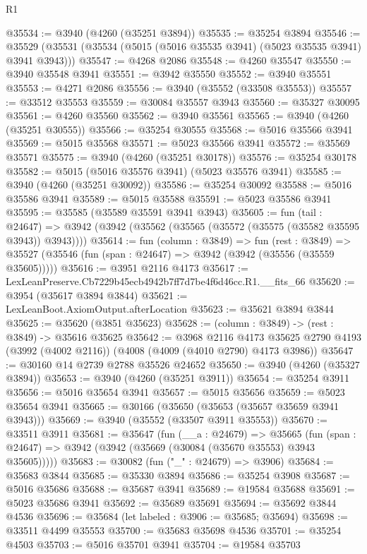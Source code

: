 \begin{lexlean}{R1}
\begin{coremodule}
@35534 := @3940 (@4260 (@35251 @3894))
@35535 := @35254 @3894
@35546 := @35529 (@35531 (@35534 (@5015 (@5016 @35535 @3941) (@5023 @35535 @3941) @3941 @3943)))
@35547 := @4268 @2086
@35548 := @4260 @35547
@35550 := @3940 @35548 @3941
@35551 := @3942 @35550
@35552 := @3940 @35551
@35553 := @4271 @2086
@35556 := @3940 (@35552 (@33508 @35553))
@35557 := @33512 @35553
@35559 := @30084 @35557 @3943
@35560 := @35327 @30095
@35561 := @4260 @35560
@35562 := @3940 @35561
@35565 := @3940 (@4260 (@35251 @30555))
@35566 := @35254 @30555
@35568 := @5016 @35566 @3941
@35569 := @5015 @35568
@35571 := @5023 @35566 @3941
@35572 := @35569 @35571
@35575 := @3940 (@4260 (@35251 @30178))
@35576 := @35254 @30178
@35582 := @5015 (@5016 @35576 @3941) (@5023 @35576 @3941)
@35585 := @3940 (@4260 (@35251 @30092))
@35586 := @35254 @30092
@35588 := @5016 @35586 @3941
@35589 := @5015 @35588
@35591 := @5023 @35586 @3941
@35595 := @35585 (@35589 @35591 @3941 @3943)
@35605 := fun (tail : @24647) =>
  @3942 (@3942 (@35562 (@35565 (@35572 (@35575 (@35582 @35595 @3943)) @3943))))
@35614 := fun (column : @3849) =>
  fun (rest : @3849) =>
  @35527 (@35546 (fun (span : @24647) => @3942 (@3942 (@35556 (@35559 @35605)))))
@35616 := @3951 @2116 @4173
@35617 := LexLeanPreserve.Cb7229b45ecb4942b7ff7d7be4f6d46cc.R1.__fits_66
@35620 := @3954 (@35617 @3894 @3844)
@35621 := LexLeanBoot.AxiomOutput.afterLocation
@35623 := @35621 @3894 @3844
@35625 := @35620 (@3851 @35623)
@35628 := (column : @3849) -> (rest : @3849) -> @35616 @35625
@35642 := @3968
    @2116
    @4173
    @35625
    @2790
    @4193
    (@3992 (@4002 @2116))
    (@4008 (@4009 (@4010 @2790) @4173 @3986))
@35647 := @30160 @14 @2739 @2788 @35526 @24652
@35650 := @3940 (@4260 (@35327 @3894))
@35653 := @3940 (@4260 (@35251 @3911))
@35654 := @35254 @3911
@35656 := @5016 @35654 @3941
@35657 := @5015 @35656
@35659 := @5023 @35654 @3941
@35665 := @30166 (@35650 (@35653 (@35657 @35659 @3941 @3943)))
@35669 := @3940 (@35552 (@33507 @3911 @35553))
@35670 := @33511 @3911
@35681 := @35647
    (fun (__a : @24679) =>
    @35665 (fun (span : @24647) => @3942 (@3942 (@35669 (@30084 (@35670 @35553) @3943 @35605)))))
@35683 := @30082 (fun ("_" : @24679) => @3906)
@35684 := @35683 @3844
@35685 := @35330 @3894
@35686 := @35254 @3908
@35687 := @5016 @35686
@35688 := @35687 @3941
@35689 := @19584 @35688
@35691 := @5023 @35686 @3941
@35692 := @35689 @35691
@35694 := @35692 @3844 @4536
@35696 := @35684 (let labeled : @3906 := @35685; @35694)
@35698 := @33511 @4499 @35553
@35700 := @35683 @35698 @4536
@35701 := @35254 @4503
@35703 := @5016 @35701 @3941
@35704 := @19584 @35703

\end{coremodule}
\end{lexlean}
